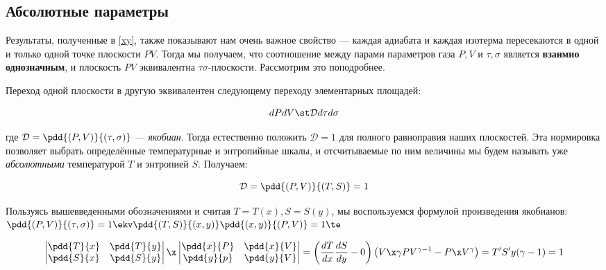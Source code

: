 \documentclass[12pt]{kiarticle}
\newcommand{\D}{\ensuremath{\mathcal{D}}}
\begin{document}
\subsection{Абсолютные параметры}

Результаты, полученные в \eqref{xy}, также показывают нам очень важное свойство --- каждая адиабата и каждая изотерма пересекаются в одной и только одной точке плоскости $ PV $. Тогда мы получаем, что соотношение между парами параметров газа $ P, V $ и $ \tau, \sigma $ является \textbf{взаимно однозначным}, и плоскость $ PV $  эквивалентна $ \tau \sigma $-плоскости. Рассмотрим это поподробнее.

Переход одной плоскости в другую эквивалентен следующему переходу элементарных площадей: 

\begin{equation}\label{}
dP dV \st \D d\tau d\sigma
\end{equation}

где $ \D  = \pdd{(P, V)}{(\tau, \sigma)} $ --- \textit{якобиан}. Тогда естественно положить $ \D = 1 $ для полного равноправия наших плоскостей. Эта нормировка позволяет выбрать определённые температурные и энтропийные шкалы, и отсчитываемые по ним величины мы будем называть уже \textit{абсолютными} температурой $ T $ и энтропией $ S $. Получаем:

\begin{equation}\label{D}
\D  = \pdd{(P, V)}{(T, S)} = 1
\end{equation}

Пользуясь вышевведенными обозначениями и считая $ T = T(x), S = S(y) $, мы воспользуемся формулой произведения якобианов: $  \pdd{(P, V)}{(\tau, \sigma)} = 1 \ekv  \pdd{(T, S)}{(x, y)} \pdd{(x, y)}{(P, V)} = 1 \te$

\begin{equation}\label{DD}
\begin{vmatrix}
\pdd{T}{x} & \pdd{T}{y} \\
\pdd{S}{x} & \pdd{S}{y} \\
\end{vmatrix} 
\x
\begin{vmatrix}
\pdd{x}{P} & \pdd{x}{V} \\
\pdd{y}{p} & \pdd{y}{V} \\
\end{vmatrix}
=
\left( \dfrac{dT}{dx} \dfrac{dS}{dy} - 0\right) \left( V\x \gamma PV^{\gamma - 1} - P\x V^\gamma\right) = T' S' y(\gamma - 1) = 1
\end{equation}
\end{document}
